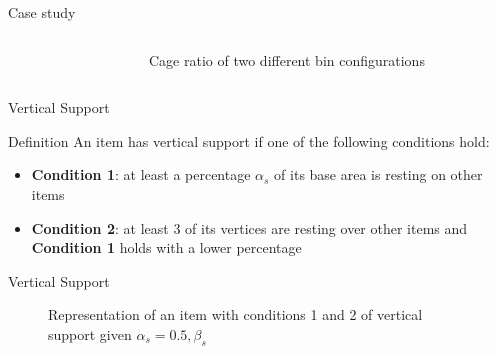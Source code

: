 \documentclass{beamer}
\begin{document}
\begin{frame}{Case study}
\begin{columns}[onlytextwidth,T]
\begin{figure}
                \end{figure}
                \begin{figure}
                    \resizebox{\columnwidth}{!}{%
                        
                    }
                    \caption{Cage ratio of two different bin configurations}
                    \label{fig:cage_ratio}
                \end{figure}
        \end{columns}
    \end{frame}

    \begin{frame}{Vertical Support}
        \begin{block}{Definition}
            An item has vertical support if one of the following conditions hold:
            \begin{itemize}
                \item \textbf{Condition 1}: at least a percentage $\alpha_s$ of its base area is resting on other items
                \item \textbf{Condition 2}: at least 3 of its vertices are resting over other items and \textbf{Condition 1} holds with a lower percentage
            \end{itemize}
        \end{block}
    \end{frame}



    \begin{frame}{Vertical Support}
        \begin{figure}[H]
            \resizebox{\columnwidth}{!}{%
                
            }
            \caption{Representation of an item with conditions 1 and 2 of vertical support given $\alpha_s = 0.5, \beta_s$}
            \label{fig:support}
        \end{figure}
    \end{frame}
\end{document}
